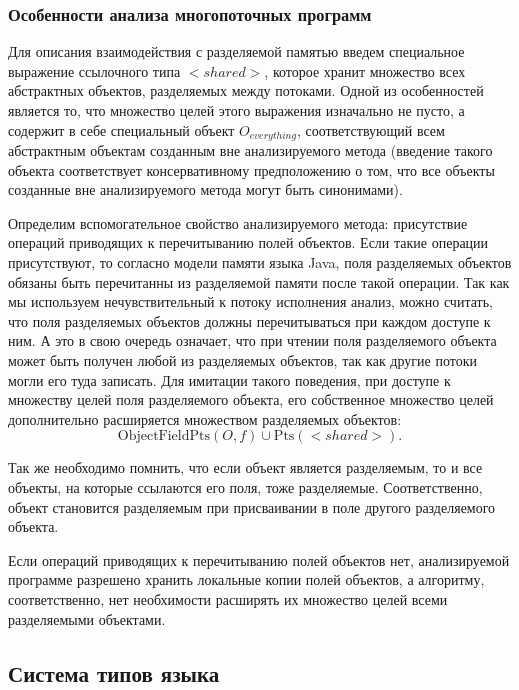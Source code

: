 \documentclass[14pt,titlepage]{extarticle}
\newcommand{\Pts}[1]{\textrm{Pts}(#1)}
\newcommand{\OFPts}[2]{\textrm{ObjectFieldPts}(#1, #2)}
\begin{document}
      \subsubsection{Особенности анализа многопоточных программ}

        Для описания взаимодействия с разделяемой памятью введем специальное
        выражение ссылочного типа ${<}shared{>}$, которое хранит множество всех
        абстрактных объектов, разделяемых между потоками. Одной из особенностей
        является то, что множество целей этого выражения изначально не пусто, а
        содержит в себе специальный объект $O_{everything}$, соответствующий
        всем абстрактным объектам созданным вне анализируемого метода (введение
        такого объекта соответствует консервативному предположению о том, что
        все объекты созданные вне анализируемого метода могут быть синонимами).

        Определим вспомогательное свойство анализируемого метода: присутствие
        операций приводящих к перечитыванию полей объектов. Если такие операции
        присутствуют, то согласно модели памяти языка Java, поля разделяемых
        объектов обязаны быть перечитанны из разделяемой памяти после такой
        операции. Так как мы используем нечувствительный к потоку исполнения
        анализ, можно считать, что поля разделяемых объектов должны
        перечитываться при каждом доступе к ним. А это в свою очередь означает,
        что при чтении поля разделяемого объекта может быть получен любой из
        разделяемых объектов, так как другие потоки могли его туда записать.
        Для имитации такого поведения, при доступе к
        множеству целей поля разделяемого объекта, его собственное множество
        целей дополнительно расширяется множеством разделяемых объектов:
        \[\OFPts{O}{f} \cup \Pts{{<}shared{>}}.\]

        Так же необходимо помнить, что если объект является разделяемым, то и
        все объекты, на которые ссылаются его поля, тоже разделяемые.
        Соответственно, объект становится разделяемым при присваивании в поле
        другого разделяемого объекта.

        Если операций приводящих к перечитыванию полей объектов нет,
        анализируемой программе разрешено хранить локальные копии полей
        объектов, а алгоритму, соответственно, нет необхимости расширять их
        множество целей всеми разделяемыми объектами.

    \subsection{Система типов языка}
      \label{section:type_system}
\end{document}
